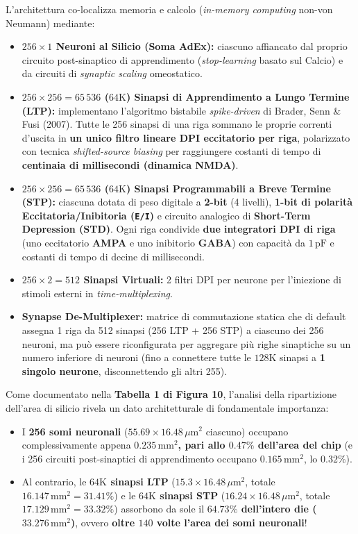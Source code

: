 \documentclass[11pt,a4paper]{article}
\begin{document}
L'architettura co-localizza memoria e calcolo (\textit{in-memory computing} non-von Neumann) mediante:
\begin{itemize}
  \item \textbf{$256 \times 1$ Neuroni al Silicio (Soma AdEx):} ciascuno affiancato dal proprio circuito post-sinaptico di apprendimento (\textit{stop-learning} basato sul Calcio) e da circuiti di \textit{synaptic scaling} omeostatico.
  \item \textbf{$256 \times 256 = 65\,536$ ($64\text{K}$) Sinapsi di Apprendimento a Lungo Termine (LTP):} implementano l'algoritmo bistabile \textit{spike-driven} di Brader, Senn \& Fusi (2007). Tutte le 256 sinapsi di una riga sommano le proprie correnti d'uscita in \textbf{un unico filtro lineare DPI eccitatorio per riga}, polarizzato con tecnica \textit{shifted-source biasing} per raggiungere costanti di tempo di \textbf{centinaia di millisecondi (dinamica NMDA)}.
  \item \textbf{$256 \times 256 = 65\,536$ ($64\text{K}$) Sinapsi Programmabili a Breve Termine (STP):} ciascuna dotata di peso digitale a \textbf{2-bit} (4 livelli), \textbf{1-bit di polarità Eccitatoria/Inibitoria (\texttt{E/I})} e circuito analogico di \textbf{Short-Term Depression (STD)}. Ogni riga condivide \textbf{due integratori DPI di riga} (uno eccitatorio \textbf{AMPA} e uno inibitorio \textbf{GABA}) con capacità da $1\,\text{pF}$ e costanti di tempo di decine di millisecondi.
  \item \textbf{$256 \times 2 = 512$ Sinapsi Virtuali:} 2 filtri DPI per neurone per l'iniezione di stimoli esterni in \textit{time-multiplexing}.
  \item \textbf{Synapse De-Multiplexer:} matrice di commutazione statica che di default assegna 1 riga da 512 sinapsi (256 LTP + 256 STP) a ciascuno dei 256 neuroni, ma può essere riconfigurata per aggregare più righe sinaptiche su un numero inferiore di neuroni (fino a connettere tutte le $128\text{K}$ sinapsi a \textbf{1 singolo neurone}, disconnettendo gli altri 255).
\end{itemize}

Come documentato nella \textbf{Tabella 1 di Figura 10}, l'analisi della ripartizione dell'area di silicio rivela un dato architetturale di fondamentale importanza:
\begin{itemize}
  \item I \textbf{256 somi neuronali} ($55.69 \times 16.48\,\mu\text{m}^2$ ciascuno) occupano complessivamente appena \textbf{$0.235\,\text{mm}^2$, pari allo $0.47\%$ dell'area del chip} (e i 256 circuiti post-sinaptici di apprendimento occupano $0.165\,\text{mm}^2$, lo $0.32\%$).
  \item Al contrario, le \textbf{$64\text{K}$ sinapsi LTP} ($15.3 \times 16.48\,\mu\text{m}^2$, totale \textbf{$16.147\,\text{mm}^2 = 31.41\%$}) e le \textbf{$64\text{K}$ sinapsi STP} ($16.24 \times 16.48\,\mu\text{m}^2$, totale \textbf{$17.129\,\text{mm}^2 = 33.32\%$}) assorbono da sole il \textbf{$64.73\%$ dell'intero die ($33.276\,\text{mm}^2$)}, ovvero \textbf{oltre $140$ volte l'area dei somi neuronali}!
\end{itemize}
\end{document}
